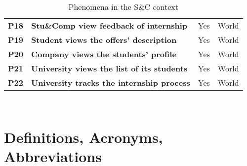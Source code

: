\begin{table}[H]
\begin{tabular}{|c|p{24em}|c|c|}
    \small\textbf{P18} &\small \textbf{Stu\&Comp view feedback of internship} & Yes & World \B\\
    \small\textbf{P19} &\small \textbf{Student views the offers' description} & Yes & World \T\B \\
    \small\textbf{P20} &\small \textbf{Company views the students' profile} & Yes & World \T\B\\
    \small\textbf{P21} &\small \textbf{University views the list of its students} & Yes & World \B\\
    \small\textbf{P22} &\small \textbf{University tracks the internship process} & Yes & World \T\B\\
    \hline
    \end{tabular}
    \\[10pt]
    \caption{Phenomena in the S\&C context}\label{table:phenomena}
\end{table}

\section{Definitions, Acronyms, Abbreviations}\label{sec:definitions}
